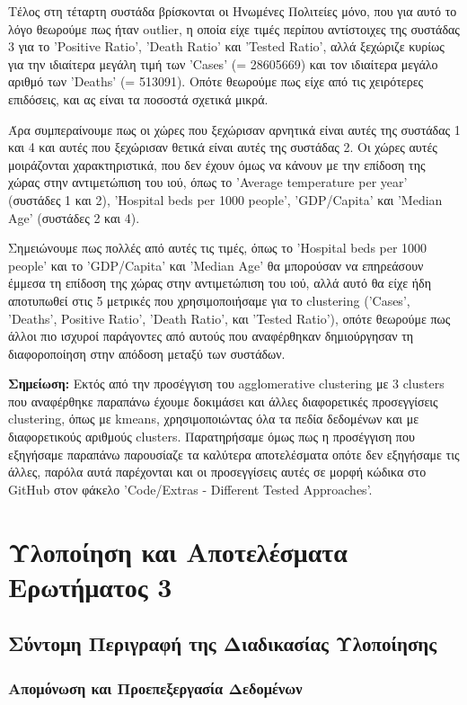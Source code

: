 \documentclass[12pt,a4paper]{article}
\begin{document}
Τέλος στη τέταρτη συστάδα βρίσκονται οι Ηνωμένες Πολιτείες μόνο, που για αυτό το λόγο θεωρούμε πως ήταν outlier, η οποία είχε τιμές περίπου αντίστοιχες της συστάδας 3 για το 'Positive Ratio', 'Death Ratio' και 'Tested Ratio', αλλά ξεχώριζε κυρίως για την ιδιαίτερα μεγάλη τιμή των 'Cases' (= 28605669) και τον ιδιαίτερα μεγάλο αριθμό των 'Deaths' (= 513091). Οπότε θεωρούμε πως είχε από τις χειρότερες επιδόσεις, και ας είναι τα ποσοστά σχετικά μικρά.

Άρα συμπεραίνουμε πως οι χώρες που ξεχώρισαν αρνητικά είναι αυτές της συστάδας 1 και 4 και αυτές που ξεχώρισαν θετικά είναι αυτές της συστάδας 2. Οι χώρες αυτές μοιράζονται χαρακτηριστικά, που δεν έχουν όμως να κάνουν με την επίδοση της χώρας στην αντιμετώπιση του ιού, όπως το 'Average temperature per year' (συστάδες 1 και 2), 'Hospital beds per 1000 people', 'GDP/Capita' και 'Median Age' (συστάδες 2 και 4).

Σημειώνουμε πως πολλές από αυτές τις τιμές, όπως το 'Hospital beds per 1000 people' και το 'GDP/Capita' και 'Median Age' θα μπορούσαν να επηρεάσουν έμμεσα τη επίδοση της χώρας στην αντιμετώπιση του ιού, αλλά αυτό θα είχε ήδη αποτυπωθεί στις 5 μετρικές που χρησιμοποιήσαμε για το clustering ('Cases', 'Deaths', Positive Ratio', 'Death Ratio', και 'Tested Ratio'), οπότε θεωρούμε πως άλλοι πιο ισχυροί παράγοντες από αυτούς που αναφέρθηκαν δημιούργησαν τη διαφοροποίηση στην απόδοση μεταξύ των συστάδων.

\textbf{Σημείωση:} Εκτός από την προσέγγιση του agglomerative clustering με 3 clusters που αναφέρθηκε παραπάνω έχουμε δοκιμάσει και άλλες διαφορετικές προσεγγίσεις clustering, όπως με kmeans, χρησιμοποιώντας όλα τα πεδία δεδομένων και με διαφορετικούς αριθμούς clusters. Παρατηρήσαμε όμως πως η προσέγγιση που εξηγήσαμε παραπάνω παρουσίαζε τα καλύτερα αποτελέσματα οπότε δεν εξηγήσαμε τις άλλες, παρόλα αυτά παρέχονται και οι προσεγγίσεις αυτές σε μορφή κώδικα στο GitHub στον φάκελο 'Code/Extras - Different Tested Approaches'.

\section{Υλοποίηση και Αποτελέσματα Ερωτήματος 3}

\subsection{Σύντομη Περιγραφή της Διαδικασίας Υλοποίησης}

\subsubsection{Απομόνωση και Προεπεξεργασία Δεδομένων}
\end{document}
